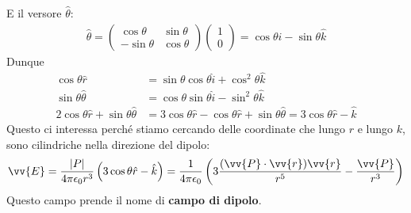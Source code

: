 \documentclass[a4paper, oneside]{article}
\begin{document}
E il versore $\hat{\theta}$:
\begin{gather*}
    \hat{\theta} = \begin{pmatrix}
        \cos\theta & \sin\theta \\
        -\sin\theta & \cos\theta 
    \end{pmatrix} \begin{pmatrix}
        1 \\
        0 
    \end{pmatrix} = \cos\theta \hat{i} - \sin\theta \hat{k}  
\end{gather*} 
Dunque 
\begin{align*}
    \cos\theta \hat{r} &= \sin\theta \cos\theta \hat{i} + \cos^{2}\theta \hat{k} \\
    \sin\theta \hat{\theta} &= \cos\theta \sin\theta \hat{i} - \sin^{2} \theta \hat{k}     \\
    2\cos\theta \hat{r} + \sin\theta \hat{\theta} &= 3\cos\theta \hat{r} - \cos\theta \hat{r} + \sin\theta \hat{\theta} = 3\cos\theta \hat{r} - \hat{k}        
\end{align*}
Questo ci interessa perché stiamo cercando delle coordinate che lungo $r$ e lungo $k$, sono cilindriche 
nella direzione del dipolo:
\begin{gather*}
    \vv{E} = \frac{\left| P \right| }{4\pi\epsilon_0 r^{3}} \left(3 \cos\theta \hat{r} - \hat{k}  \right) = \frac{1}{4\pi\epsilon_0} \left(3 \frac{(\vv{P} \cdot \vv{r}  ) \vv{r} }{r^{5}} - \frac{\vv{P} }{r^{3}}\right) 
\end{gather*}
Questo campo prende il nome di \textbf{campo di dipolo}.
\end{document}
